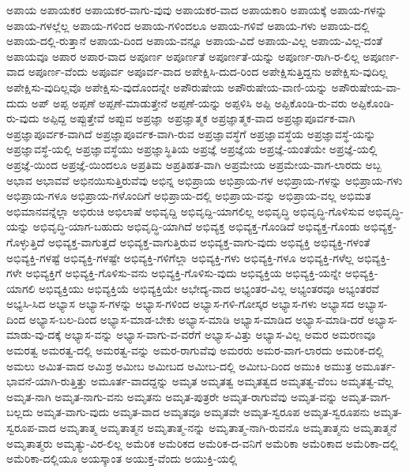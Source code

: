 {ಅಪಾಯ
ಅಪಾಯಕರ
ಅಪಾಯಕರ-ವಾಗು-ವುವು
ಅಪಾಯಕರ-ವಾದ
ಅಪಾಯಕಾರಿ
ಅಪಾಯಕ್ಕೆ
ಅಪಾಯ-ಗಳನ್ನು
ಅಪಾಯ-ಗಳಲ್ಲೆಲ್ಲ
ಅಪಾಯ-ಗಳಿಂದ
ಅಪಾಯ-ಗಳಿಂದಲೂ
ಅಪಾಯ-ಗಳಿವೆ
ಅಪಾಯ-ಗಳು
ಅಪಾಯ-ದಲ್ಲಿ
ಅಪಾಯ-ದಲ್ಲಿ-ರುತ್ತಾನೆ
ಅಪಾಯ-ದಿಂದ
ಅಪಾಯ-ವನ್ನೂ
ಅಪಾಯ-ವಿದೆ
ಅಪಾಯ-ವಿಲ್ಲ
ಅಪಾಯ-ವಿಲ್ಲ-ದಂತೆ
ಅಪಾಯವೂ
ಅಪಾರ
ಅಪಾರ-ವಾದ
ಅಪೂರ್ಣ
ಅಪೂರ್ಣತೆ
ಅಪೂರ್ಣತೆ-ಯನ್ನು
ಅಪೂರ್ಣ-ರಾಗಿ-ರ-ಲಿಲ್ಲ
ಅಪೂರ್ಣ-ವಾದ
ಅಪೂರ್ಣ-ವೆಂದು
ಅಪೂರ್ವ
ಅಪೂರ್ವ-ವಾದ
ಅಪೇಕ್ಷಿಸಿ-ದುದ-ರಿಂದ
ಅಪೇಕ್ಷಿಸುತ್ತಿದ್ದನು
ಅಪೇಕ್ಷಿಸು-ವುದಿಲ್ಲ
ಅಪೇಕ್ಷಿಸು-ವುದಿಲ್ಲವೊ
ಅಪೇಕ್ಷಿಸು-ವುದೊಂದನ್ನೇ
ಅಪೌರುಷೇಯ
ಅಪೌರುಷೇಯ-ವಾಣಿ-ಯನ್ನು
ಅಪೌರುಷೇಯ-ವಾ-ದುದು
ಅಪ್
ಅಪ್ಪ
ಅಪ್ಪಣೆ
ಅಪ್ಪಣೆ-ಮಾಡುತ್ತೇನೆ
ಅಪ್ಪಣೆ-ಯನ್ನು
ಅಪ್ಪಳಿಸಿ
ಅಪ್ಪಿ
ಅಪ್ಪಿಕೊಂಡಿ-ರು-ವರು
ಅಪ್ಪಿಕೊಂಡಿ-ರು-ವುದು
ಅಪ್ಪಿದ್ದ
ಅಪ್ಪುತ್ತೇವೆ
ಅಪ್ಪುವ
ಅಪ್ರಜ್ಞಾ
ಅಪ್ರಜ್ಞಾತ್ಮಕ
ಅಪ್ರಜ್ಞಾತ್ಮಕ-ವಾದ
ಅಪ್ರಜ್ಞಾಪೂರ್ವಕ-ವಾಗಿ
ಅಪ್ರಜ್ಞಾಪೂರ್ವಕ-ವಾಗಿದೆ
ಅಪ್ರಜ್ಞಾಪೂರ್ವಕ-ವಾಗಿ-ರುವ
ಅಪ್ರಜ್ಞಾವಸ್ಥೆಗೆ
ಅಪ್ರಜ್ಞಾವಸ್ಥೆಯ
ಅಪ್ರಜ್ಞಾವಸ್ಥೆ-ಯನ್ನು
ಅಪ್ರಜ್ಞಾವಸ್ಥೆ-ಯಲ್ಲಿ
ಅಪ್ರಜ್ಞಾವಸ್ಥೆಯು
ಅಪ್ರಜ್ಞಾಸ್ಥಿತಿಯ
ಅಪ್ರಜ್ಞೆ
ಅಪ್ರಜ್ಞೆಯ
ಅಪ್ರಜ್ಞೆ-ಯಂತೆಯೇ
ಅಪ್ರಜ್ಞೆ-ಯಲ್ಲಿ
ಅಪ್ರಜ್ಞೆ-ಯಿಂದ
ಅಪ್ರಜ್ಞೆ-ಯಿಂದಲೂ
ಅಪ್ರತಿಮ
ಅಪ್ರತಿಹತ-ವಾಗಿ
ಅಪ್ರಮೇಯ
ಅಪ್ರಮೇಯ-ವಾಗ-ಲಾರದು
ಅಬ್ಬ
ಅಭಾವ
ಅಭಾವವೆ
ಅಭಿನಯಿಸುತ್ತಿರುವೆವು
ಅಭಿನ್ನ
ಅಭಿಪ್ರಾಯ
ಅಭಿಪ್ರಾಯ-ಗಳ
ಅಭಿಪ್ರಾಯ-ಗಳನ್ನು
ಅಭಿಪ್ರಾಯ-ಗಳು
ಅಭಿಪ್ರಾಯ-ಗಳೂ
ಅಭಿಪ್ರಾಯ-ಗಳೊಂದಿಗೆ
ಅಭಿಪ್ರಾಯ-ದಲ್ಲಿ
ಅಭಿಪ್ರಾಯ-ವನ್ನು
ಅಭಿಪ್ರಾಯ-ವಲ್ಲ
ಅಭಿಮತ
ಅಭಿಮಾನವನ್ನೆಲ್ಲಾ
ಅಭಿರುಚಿ
ಅಭಿಲಾಷೆ
ಅಭಿವೃದ್ದಿ
ಅಭಿವೃದ್ದಿ-ಯಾಗಲಿಲ್ಲ
ಅಭಿವೃದ್ಧಿ
ಅಭಿವೃದ್ಧಿ-ಗೊಳಿಸುವ
ಅಭಿವೃದ್ಧಿ-ಯನ್ನು
ಅಭಿವೃದ್ಧಿ-ಯಾಗ-ಬಹುದು
ಅಭಿವೃದ್ಧಿ-ಯಾಗಿದೆ
ಅಭಿವ್ಯಕ್ತ
ಅಭಿವ್ಯಕ್ತ-ಗೊಂಡಿದೆ
ಅಭಿವ್ಯಕ್ತ-ಗೊಂಡು
ಅಭಿವ್ಯಕ್ತ-ಗೊಳ್ಳುತ್ತಿದೆ
ಅಭಿವ್ಯಕ್ತ-ವಾಗುತ್ತದೆ
ಅಭಿವ್ಯಕ್ತ-ವಾಗುತ್ತಿರುವ
ಅಭಿವ್ಯಕ್ತ-ವಾಗು-ವುದು
ಅಭಿವ್ಯಕ್ತಿ
ಅಭಿವ್ಯಕ್ತಿ-ಗಳಂತೆ
ಅಭಿವ್ಯಕ್ತಿ-ಗಳಷ್ಟೆ
ಅಭಿವ್ಯಕ್ತಿ-ಗಳಷ್ಟೇ
ಅಭಿವ್ಯಕ್ತಿ-ಗಳಿಗೆಲ್ಲಾ
ಅಭಿವ್ಯಕ್ತಿ-ಗಳು
ಅಭಿವ್ಯಕ್ತಿ-ಗಳೂ
ಅಭಿವ್ಯಕ್ತಿ-ಗಳೆಲ್ಲ
ಅಭಿವ್ಯಕ್ತಿ-ಗಳೇ
ಅಭಿವ್ಯಕ್ತಿಗೆ
ಅಭಿವ್ಯಕ್ತಿ-ಗೊಳಿಸು-ವನು
ಅಭಿವ್ಯಕ್ತಿ-ಗೊಳಿಸು-ವುದು
ಅಭಿವ್ಯಕ್ತಿಯ
ಅಭಿವ್ಯಕ್ತಿ-ಯನ್ನೇ
ಅಭಿವ್ಯಕ್ತಿ-ಯಾಗಲಿ
ಅಭಿವ್ಯಕ್ತಿಯು
ಅಭಿವ್ಯಕ್ತಿಯೆ
ಅಭಿವ್ಯಕ್ತಿಯೇ
ಅಭೇದ್ಯ-ವಾದ
ಅಭ್ಯಂತರ-ವಿಲ್ಲ
ಅಭ್ಯಂತರವೂ
ಅಭ್ಯಂತರವೆ
ಅಭ್ಯಸಿ-ಸಿದ
ಅಭ್ಯಾಸ
ಅಭ್ಯಾಸ-ಗಳನ್ನು
ಅಭ್ಯಾಸ-ಗಳಿಂದ
ಅಭ್ಯಾಸ-ಗಳಿ-ಗೋಸ್ಕರ
ಅಭ್ಯಾಸ-ಗಳು
ಅಭ್ಯಾಸದ
ಅಭ್ಯಾಸ-ದಿಂದ
ಅಭ್ಯಾಸ-ಬಲ-ದಿಂದ
ಅಭ್ಯಾಸ-ಮಾಡ-ಬೇಕು
ಅಭ್ಯಾಸ-ಮಾಡಿ
ಅಭ್ಯಾಸ-ಮಾಡಿದ
ಅಭ್ಯಾಸ-ಮಾಡಿ-ದರೆ
ಅಭ್ಯಾಸ-ಮಾಡು-ವು-ದಕ್ಕೆ
ಅಭ್ಯಾಸ-ವನ್ನು
ಅಭ್ಯಾಸ-ವಾಗು-ವ-ವರೆಗೆ
ಅಭ್ಯಾಸ-ವಿತ್ತು
ಅಭ್ಯಾಸ-ವಿಲ್ಲ
ಅಮರ
ಅಮರಣವೂ
ಅಮರತ್ವ
ಅಮರತ್ವ-ದಲ್ಲಿ
ಅಮರತ್ವ-ವನ್ನು
ಅಮರ-ರಾಗುವೆವು
ಅಮರರು
ಅಮರ-ವಾಗ-ಲಾರದು
ಅಮರಿಕ-ದಲ್ಲಿ
ಅಮಲು
ಅಮಿತ-ವಾದ
ಅಮಿಶ್ರ
ಅಮೀಬ
ಅಮೀಬದ
ಅಮೀಬ-ದಲ್ಲಿ
ಅಮೀಬ-ದಿಂದ
ಅಮುಕಿ
ಅಮುತ್ರ
ಅಮೂರ್ತ-ಭಾವನೆ-ಯಾಗಿ-ರುತ್ತಿತ್ತು
ಅಮೂರ್ತ-ವಾದದ್ದನ್ನು
ಅಮೃತ
ಅಮೃತತ್ವ
ಅಮೃತತ್ವದ
ಅಮೃತತ್ವ-ವೆಂಬ
ಅಮೃತತ್ವ-ವೆಲ್ಲ
ಅಮೃತ-ನಾಗಿ
ಅಮೃತ-ನಾಗು-ವನು
ಅಮೃತನು
ಅಮೃತ-ಪುತ್ರರೇ
ಅಮೃತ-ರಾಗುವೆವು
ಅಮೃತ-ವನ್ನು
ಅಮೃತ-ವಾಗ-ಬಲ್ಲದು
ಅಮೃತ-ವಾಗು-ವುದು
ಅಮೃತ-ವಾದ
ಅಮೃತವೂ
ಅಮೃತವೇ
ಅಮೃತ-ಸ್ವರೂಪ
ಅಮೃತ-ಸ್ವರೂಪನು
ಅಮೃತ-ಸ್ವರೂಪ-ವಾದ
ಅಮೃತಾತ್ಮ
ಅಮೃತಾತ್ಮನ
ಅಮೃತಾತ್ಮ-ನನ್ನು
ಅಮೃತಾತ್ಮ-ನಾಗಿ-ರುವನೊ
ಅಮೃತಾತ್ಮನು
ಅಮೃತಾತ್ಮನೆ
ಅಮೃತಾತ್ಮರು
ಅಮೃತ್ಯು-ವಿರ-ಲಿಲ್ಲ
ಅಮೆರಿಕ
ಅಮೆರಿಕದ
ಅಮೆರಿಕ-ದ-ವನಿಗೆ
ಅಮೆರಿಕಾ
ಅಮೆರಿಕಾದ
ಅಮೆರಿಕಾ-ದಲ್ಲಿ
ಅಮೆರಿಕಾ-ದಲ್ಲಿಯೂ
ಅಯಸ್ಕಾಂತ
ಅಯುಕ್ತ-ವೆಂದು
ಅಯುಕ್ತಿ-ಯಲ್ಲಿ
}
